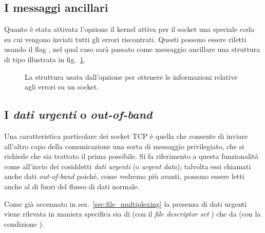 
% 


\subsection{I messaggi ancillari}
\label{sec:net_ancillary_data}

Quanto è stata attivata l'opzione  il kernel attiva per il
socket una speciale coda su cui vengono inviati tutti gli errori riscontrati.
Questi possono essere riletti usando il flag , nel qual
caso sarà passato come messaggio ancillare una struttura di tipo
 illustrata in
fig.~\ref{fig:sock_extended_err_struct}.

\begin{figure}[!htb]
  \footnotesize \centering
  \begin{minipage}[c]{\textwidth}
  \end{minipage}
  \caption{La struttura  usata dall'opzione
     per ottenere le informazioni relative agli errori su
    un socket.}
  \label{fig:sock_extended_err_struct}
\end{figure}


\subsection{I \textsl{dati urgenti} o \textit{out-of-band}}
\label{sec:TCP_urgent_data}


Una caratteristica particolare dei socket TCP è quella che consente di inviare
all'altro capo della comunicazione una sorta di messaggio privilegiato, che si
richiede che sia trattato il prima possibile. Si fa riferimento a questa
funzionalità come all'invio dei cosiddetti \textsl{dati urgenti} (o
\textit{urgent data}); talvolta essi chiamati anche dati \textit{out-of-band}
poiché, come vedremo più avanti, possono essere letti anche al di fuori del
flusso di dati normale.

Come già accennato in sez.~\ref{sec:file_multiplexing} la presenza di dati
urgenti viene rilevata in maniera specifica sia di  (con il
\textit{file descriptor set} ) che da  (con la
condizione ).


